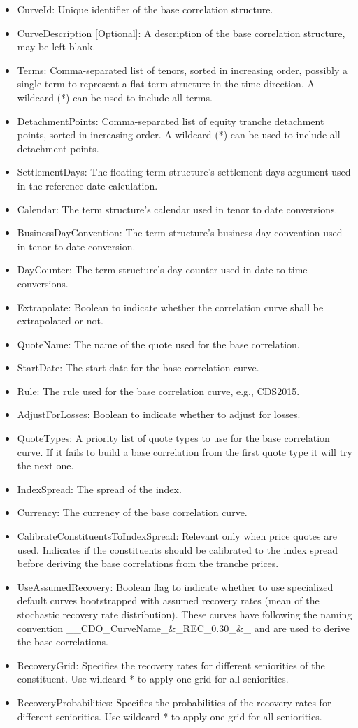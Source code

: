 \begin{itemize}
\item CurveId: Unique identifier of the base correlation structure.
\item CurveDescription [Optional]: A description of the base correlation structure, may be left blank.
\item Terms: Comma-separated list of tenors, sorted in increasing order, possibly a single term to represent a flat term structure in the time direction. A wildcard (*) can be used to include all terms.
\item DetachmentPoints: Comma-separated list of equity tranche detachment points, sorted in increasing order. A wildcard (*) can be used to include all detachment points.
\item SettlementDays: The floating term structure's settlement days argument used in the reference date calculation.
\item Calendar: The term structure's calendar used in tenor to date conversions.
\item BusinessDayConvention: The term structure's business day convention used in tenor to date conversion.
\item DayCounter: The term structure's day counter used in date to time conversions.
\item Extrapolate: Boolean to indicate whether the correlation curve shall be extrapolated or not.
\item QuoteName: The name of the quote used for the base correlation.
\item StartDate: The start date for the base correlation curve.
\item Rule: The rule used for the base correlation curve, e.g., CDS2015.
\item AdjustForLosses: Boolean to indicate whether to adjust for losses.
\item QuoteTypes: A priority list of quote types to use for the base correlation curve. If it fails to build a base correlation from the first quote type it will try the next one.
\item IndexSpread: The spread of the index.
\item Currency: The currency of the base correlation curve.
\item CalibrateConstituentsToIndexSpread: Relevant only when price quotes are used. Indicates if the constituents should be calibrated to the index spread before deriving the base correlations from the tranche prices.
\item UseAssumedRecovery: Boolean flag to indicate whether to use specialized default curves bootstrapped with assumed recovery rates (mean of the stochastic recovery rate distribution). These curves have following the naming convention
\_\_CDO\_CurveName\_\&\_REC\_0.30\_\&\_ and are used to derive the base correlations.
\item RecoveryGrid: Specifies the recovery rates for different seniorities of the constituent. Use wildcard * to apply one grid for all seniorities.
\item RecoveryProbabilities: Specifies the probabilities of the recovery rates for different seniorities. Use wildcard * to apply one grid for all seniorities.
\end{itemize}
